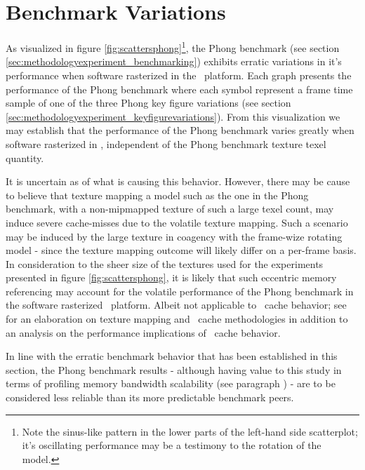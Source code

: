 

\section{Benchmark Variations}
\label{sec:results_benchmarkvariations}
As visualized in figure \ref{fig:scattersphong}\footnote{Note the sinus-like pattern in the lower parts of the left-hand side scatterplot; it's oscillating performance may be a testimony to the rotation of the model.}, the Phong benchmark (see section \ref{sec:methodologyexperiment_benchmarking}) exhibits erratic variations in it's performance when software rasterized in the \dvttermsimics\ platform.
Each graph presents the performance of the Phong benchmark where each symbol represent a frame time sample of one of the three Phong key figure variations (see section \ref{sec:methodologyexperiment_keyfigurevariations}).
From this visualization we may establish that the performance of the Phong benchmark varies greatly when software rasterized in \dvttermsimics , independent of the Phong benchmark texture texel quantity.

It is uncertain as of what is causing this behavior.
However, there may be cause to believe that texture mapping a model such as the one in the Phong benchmark, with a non-mipmapped texture of such a large texel count, may induce severe cache-misses due to the volatile texture mapping.
Such a scenario may be induced by the large texture in coagency with the frame-wize rotating model - since the texture mapping outcome will likely differ on a per-frame basis.
In consideration to the sheer size of the textures used for the experiments presented in figure \ref{fig:scattersphong}, it is likely that such eccentric memory referencing may account for the volatile performance of the Phong benchmark in the software rasterized \dvttermsimics\ platform.
Albeit not applicable to \dvttermcpu\ cache behavior; see ~ for an elaboration on texture mapping and \dvttermgpu\ cache methodologies in addition to an analysis on the performance implications of \dvttermgpu\ cache behavior.

In line with the erratic benchmark behavior that has been established in this section, the Phong benchmark results - although having value to this study in terms of profiling memory bandwidth scalability (see paragraph ) - are to be considered less reliable than its more predictable benchmark peers.

